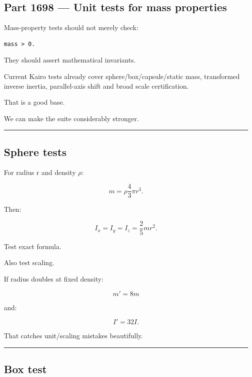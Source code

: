 \subsection{Part 1698 --- Unit tests for mass properties}\label{06-engine-ii-ch039-part-1698-unit-tests-for-mass-properties}

\hypertarget{06-engine-ii-ch039-part-1698-unit-tests-for-mass-properties}{}

Mass-property tests should not merely check:

\begin{verbatim}
mass > 0.
\end{verbatim}

They should assert mathematical invariants.

Current Kairo tests already cover sphere/box/capsule/static mass, transformed inverse inertia, parallel-axis shift and broad scale certification.

That is a good base.

We can make the suite considerably stronger.

\begin{center}\rule{0.5\linewidth}{0.5pt}\end{center}

\subsection{Sphere tests}\label{06-engine-ii-ch039-sphere-tests}

\hypertarget{06-engine-ii-ch039-sphere-tests}{}

For radius r and density \(\rho\):

\[
m
=
\rho
\frac43\pi r^3.
\]

Then:

\[
I_x=I_y=I_z
=
\frac25mr^2.
\]

Test exact formula.

Also test scaling.

If radius doubles at fixed density:

\[
m'=
8m
\]

and:

\[
I'=
32I.
\]

That catches unit/scaling mistakes beautifully.

\begin{center}\rule{0.5\linewidth}{0.5pt}\end{center}

\subsection{Box test}\label{06-engine-ii-ch039-box-test}

